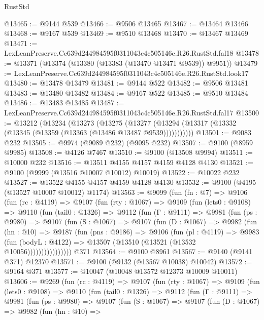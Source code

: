 \begin{lexlean}{RustStd}
\begin{coremodule}
@13465 := @9144 @539
@13466 := @9506 @13465
@13467 := @13464 @13466
@13468 := @9167 @539
@13469 := @9510 @13468
@13470 := @13467 @13469
@13471 := LexLeanPreserve.Cc639d244984595f0311043c4c505146e.R26.RustStd.fal18
@13478 := @13371 (@13374 (@13380 (@13383 (@13470 @13471 @9539)) @9951))
@13479 := LexLeanPreserve.Cc639d244984595f0311043c4c505146e.R26.RustStd.look17
@13480 := @13478 @13479
@13481 := @9144 @522
@13482 := @9506 @13481
@13483 := @13480 @13482
@13484 := @9167 @522
@13485 := @9510 @13484
@13486 := @13483 @13485
@13487 := LexLeanPreserve.Cc639d244984595f0311043c4c505146e.R26.RustStd.fal17
@13500 := @13212
    (@13234
      (@13273
        (@13275
          (@13277 (@13294 (@13317 (@13332 (@13345 (@13359 (@13363 (@13486 @13487 @9539)))))))))))
@13501 := @9083 @232
@13505 := @9974 (@9089 @232) (@9095 @232)
@13507 := @9100 (@8959 @9985)
@13508 := @4126 @7467
@13510 := @9100 (@13508 @9994)
@13511 := @10000 @232
@13516 := @13511 @4155 @4157 @4159 @4128 @4130
@13521 := @9100 (@9999 (@13516 @10007 @10012) @10019)
@13522 := @10022 @232
@13527 := @13522 @4155 @4157 @4159 @4128 @4130
@13532 := @9100 (@4195 (@13527 @10007 @10012) @1174)
@13563 := @9099
    (fun (fn : @7) =>
    @9106
      (fun (rc : @4119) =>
      @9107
        (fun (rty : @1067) =>
        @9109
          (fun (lets0 : @9108) =>
          @9110
            (fun (tail0 : @1326) =>
            @9112
              (fun (Γ : @9111) =>
              @9981
                (fun (ps : @9980) =>
                @9107
                  (fun (S : @1067) =>
                  @9107
                    (fun (D : @1067) =>
                    @9982
                      (fun (hn : @10) =>
                      @9187
                        (fun (pns : @9186) =>
                        @9106
                          (fun (pl : @4119) =>
                          @9983
                            (fun (bodyL : @4122) =>
                            @13507 (@13510 (@13521 (@13532 @10056))))))))))))))))
    @371
@13564 := @9100 @8961
@13567 := @9140 (@9141 @371) @12370
@13571 := @9100 (@9132 (@13567 @10038) @10042)
@13572 := @9164 @371
@13577 := @10047 (@10048 @13572 @12373 @10009 @10011)
@13606 := @9269
    (fun (rc : @4119) =>
    @9107
      (fun (rty : @1067) =>
      @9109
        (fun (lets0 : @9108) =>
        @9110
          (fun (tail0 : @1326) =>
          @9112
            (fun (Γ : @9111) =>
            @9981
              (fun (ps : @9980) =>
              @9107
                (fun (S : @1067) =>
                @9107
                  (fun (D : @1067) =>
                  @9982
                    (fun (hn : @10) =>

\end{coremodule}
\end{lexlean}
